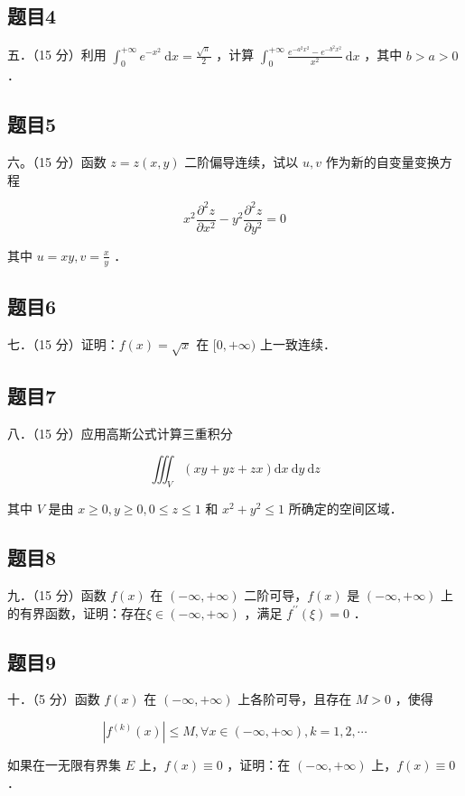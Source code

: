 \documentclass{article}
\begin{document}
\subsection{题目4}
五．（15 分）利用 \(\int_{0}^{+\infty} e^{-x^{2}} \mathrm{~d} x=\frac{\sqrt{\pi}}{2}\) ，计算 \(\int_{0}^{+\infty} \frac{e^{-a^{2} x^{2}}-e^{-b^{2} x^{2}}}{x^{2}} \mathrm{~d} x\) ，其中 \(b>a>0\) ．

\subsection{题目5}
六。（15 分）函数 \(z=z(x, y)\) 二阶偏导连续，试以 \(u, v\) 作为新的自变量变换方程

\[
x^{2} \frac{\partial^{2} z}{\partial x^{2}}-y^{2} \frac{\partial^{2} z}{\partial y^{2}}=0
\]

其中 \(u=x y, v=\frac{x}{y}\) ．

\subsection{题目6}
七．（15 分）证明：\(f(x)=\sqrt{x}\) 在 \([0,+\infty)\) 上一致连续．

\subsection{题目7}
八．（15 分）应用高斯公式计算三重积分

\[
\iiint_{V}(x y+y z+z x) \mathrm{d} x \mathrm{~d} y \mathrm{~d} z
\]

其中 \(V\) 是由 \(x \geq 0, y \geq 0,0 \leq z \leq 1\) 和 \(x^{2}+y^{2} \leq 1\) 所确定的空间区域．

\subsection{题目8}
九．（15 分）函数 \(f(x)\) 在 \((-\infty,+\infty)\) 二阶可导，\(f(x)\) 是 \((-\infty,+\infty)\) 上的有界函数，证明：存在\(\xi \in(-\infty,+\infty)\) ，满足 \(f^{\prime \prime}(\xi)=0\) ．

\subsection{题目9}
十．（5 分）函数 \(f(x)\) 在 \((-\infty,+\infty)\) 上各阶可导，且存在 \(M>0\) ，使得

\[
\left|f^{(k)}(x)\right| \leq M, \forall x \in(-\infty,+\infty), k=1,2, \cdots
\]

如果在一无限有界集 \(E\) 上，\(f(x) \equiv 0\) ，证明：在 \((-\infty,+\infty)\) 上，\(f(x) \equiv 0\) ．
\end{document}
